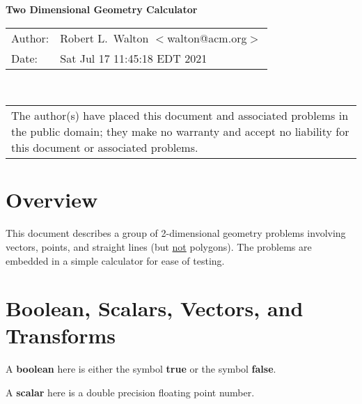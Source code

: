 \documentclass[12pt]{article}
\begin{document}
\newcommand{\header}[1]{\underline{\bf #1}}
\newcommand{\file}[1]{{\bf #1}}
\newcommand{\blankpage}{\newpage\vspace*{3.5in}%
    \centerline{\Large This Page is Intentionally Left Blank}}
\setlength{\parindent}{0.0in}
\setlength{\parskip}{1ex}
\newcommand{\key}[1]{{\bf #1}}
\newcommand{\TT}[1]{{\tt \bfseries #1}}
\newcommand{\EOL}{\penalty \exhyphenpenalty}
\newtheorem{definition}{Definition}[section]
\newtheorem{lemma}[definition]{Lemma}
\newtheorem{corollary}[definition]{Corollary}
\newtheorem{theorem}[definition]{Theorem}
\newtheorem{algorithm}[definition]{Algorithm}
\newenvironment{indpar}[1]%
    {\begin{list}{}{\setlength{\leftmargin}{#1}}\item[]}%
    {\end{list}}

\begin{center}
{\Large \bf Two Dimensional Geometry Calculator}

\begin{tabular}{ll}
Author:	      & Robert L.~Walton $<$walton@acm.org$>$ \\
Date:         & Sat Jul 17 11:45:18 EDT 2021
\end{tabular}
\\[2ex]
\begin{tabular}{p{5in}}
The author(s) have placed this document and associated problems
in the public domain;
they make no warranty and accept no liability for this document
or associated problems.
\end{tabular}

\end{center}

\medskip

\section{Overview}
This document describes a group of 2-dimensional geometry problems
involving vectors, points, and straight lines
(but \underline{not} polygons).
The problems are embedded in a simple calculator for ease of
testing.

\section{Boolean, Scalars, Vectors, and Transforms}
A \key{boolean} here is either the symbol \key{true} or the symbol \key{false}.

A \key{scalar} here is a double precision floating point number.
\end{document}
